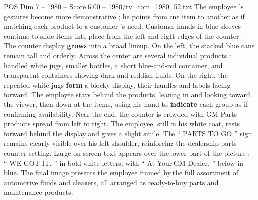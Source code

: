 \begin{textsample}{POS Dim 7 – 1980 – Score 6.00 – 1980/tv\_com\_1980\_52.txt}
The employee ’s gestures become more demonstrative ; he points from one item to another as if matching each product to a customer ’s need.
Customer hands in blue sleeves continue to slide items into place from the left and right edges of the counter.
The counter display \textbf{grows} into a broad lineup.
On the left, the stacked blue cans remain tall and orderly.
Across the center are several individual products : handled white jugs, smaller bottles, a short blue-and-red container, and transparent containers showing dark and reddish fluids.
On the right, the repeated white jugs \textbf{form} a blocky display, their handles and labels facing forward.
The employee stays behind the products, leaning in and looking toward the viewer, then down at the items, using his hand to \textbf{indicate} each group as if confirming availability.
Near the end, the counter is crowded with GM Parts products spread from left to right.
The employee, still in his white coat, rests forward behind the display and gives a slight smile.
The “ PARTS TO GO ” sign remains clearly visible over his left shoulder, reinforcing the dealership parts-counter setting.
Large on-screen text appears over the lower part of the picture : “ WE GOT IT. ” in bold white letters, with “ At Your GM Dealer. ” below in blue.
The final image presents the employee framed by the full assortment of automotive fluids and cleaners, all arranged as ready-to-buy parts and maintenance products.

\end{textsample}
